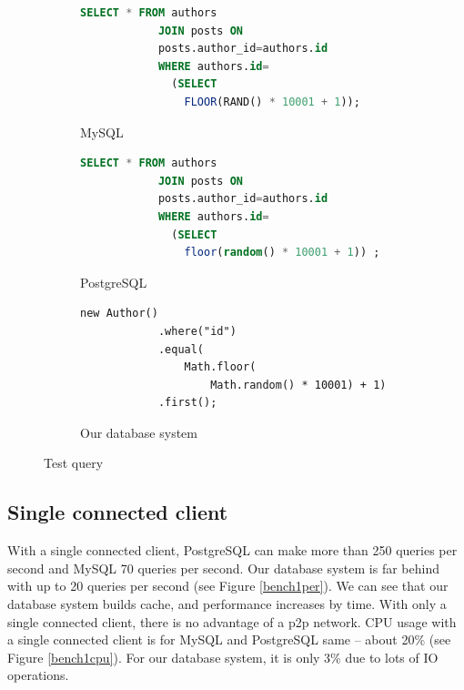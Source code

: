 \begin{figure}[h]
    \begin{subfigure}{.3\textwidth}
        \centering
        \begin{lstlisting}[language=SQL,basicstyle=\tiny]
            SELECT * FROM authors 
            JOIN posts ON 
            posts.author_id=authors.id  
            WHERE authors.id=
              (SELECT 
                FLOOR(RAND() * 10001 + 1));
        \end{lstlisting}
        \caption{MySQL}
    \end{subfigure}%
    \begin{subfigure}{.3\textwidth}
        \centering
        \begin{lstlisting}[language=SQL,basicstyle=\tiny]
            SELECT * FROM authors 
            JOIN posts ON 
            posts.author_id=authors.id  
            WHERE authors.id=
              (SELECT 
                floor(random() * 10001 + 1)) ;
        \end{lstlisting}
        \caption{PostgreSQL}
    \end{subfigure}
    \begin{subfigure}{.3\textwidth}
        \centering
        \begin{lstlisting}[style=ES6,basicstyle=\tiny]
            new Author()
            .where("id")
            .equal(
                Math.floor(
                    Math.random() * 10001) + 1)
            .first();
        \end{lstlisting}
        \caption{Our database system}
    \end{subfigure}
    \caption{Test query}
    \label{benchQuery}
\end{figure}


\subsection*{Single connected client}
With a single connected client, PostgreSQL can make more than 250 queries per second and MySQL 70 queries per second. Our database system is far behind with up to 20 queries per second (see Figure \ref{bench1per}). We can see that our database system builds cache, and performance increases by time. With only a single connected client, there is no advantage of a p2p network. CPU usage with a single connected client is for MySQL and PostgreSQL same -- about 20\% (see Figure \ref{bench1cpu}). For our database system, it is only 3\% due to lots of IO operations. 

